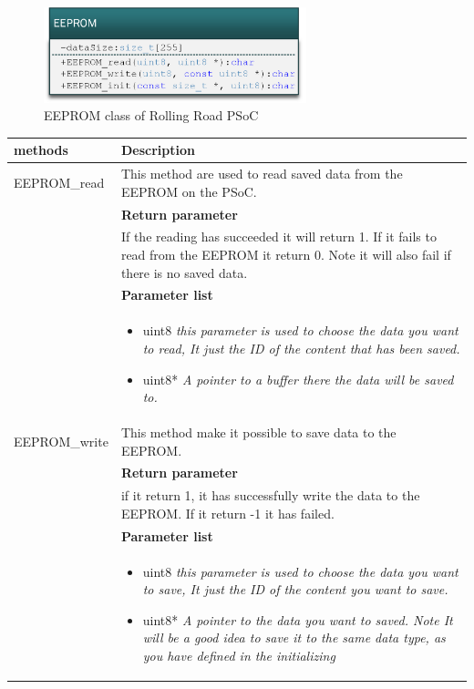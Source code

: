 \begin{figure}[H]
	\centering
	\includegraphics [width=3in]{Software/Pictures/klassediagram_EEPROM.png}
	\caption{EEPROM class of Rolling Road PSoC}
	\label{fig:Class_diagram_EEPROM_RR_PSoC}
\end{figure}


\begin{table}[H]
	\centering
	\begin{tabular}{|p{5 cm}|p{10 cm}|}
		\hline
		\textbf{methods} & \textbf{Description} \\ \hline
		
		EEPROM\_read
		& This method are used to read saved data from the EEPROM on the PSoC.
		\\ & \textbf{Return parameter}
		\\ & If the reading has succeeded it will return 1. If it fails to read from the EEPROM it return 0. Note it will also fail if there is no saved data.
		\\ & \textbf{Parameter list}
		\\ & \begin{itemize}
			\item {\large uint8}
			\subitem \textit{this parameter is used to choose the data you want to read, It just the ID of the content that has been saved.}
			\item {\large uint8*}
			\subitem \textit{A pointer to a buffer there the data will be saved to.}
		\end{itemize}
		\\ \hline
		
		EEPROM\_write
		& This method make it possible to save data to the EEPROM.
		\\ & \textbf{Return parameter}
		\\ & if it return 1, it has successfully write the data to the EEPROM. If it return -1 it has failed.
		\\ & \textbf{Parameter list}
		\\ & \begin{itemize}
			\item {\large uint8}
			\subitem \textit{this parameter is used to choose the data you want to save, It just the ID of the content you want to save.}
			\item {\large uint8*}
			\subitem \textit{A pointer to the data you want to saved. Note It will be a good idea to save it to the same data type, as you have defined in the initializing}
		\end{itemize}
		\\ \hline
		

\end{tabular}
\end{table}
